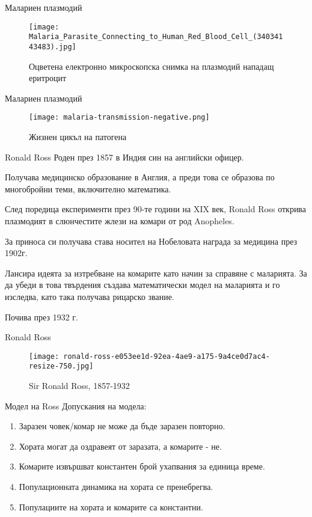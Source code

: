 \begin{frame}[t]{Малариен плазмодий}
  \begin{figure}
    \texttt{[image: Malaria\_Parasite\_Connecting\_to\_Human\_Red\_Blood\_Cell\_(34034143483).jpg]}
    \centering
    \caption{Оцветена електронно микроскопска снимка на плазмодий нападащ еритроцит}
  \end{figure}
\end{frame}

\begin{frame}[t]{Малариен плазмодий}
  \begin{figure}
    \texttt{[image: malaria-transmission-negative.png]}
    \centering
    \caption{Жизнен цикъл на патогена}
  \end{figure}
\end{frame}

\begin{frame}[t]{Ronald Ross}
  Роден през 1857 в Индия син на английски офицер.

  Получава медицинско образование в Англия, а преди това се образова по многобройни теми, включително математика.

  След поредица експерименти през 90-те години на XIX век, Ronald Ross открива плазмодият в слюнчестите жлези на комари от род Anopheles.

  За приноса си получава става носител на Нобеловата награда за медицина през 1902г.

  Лансира идеята за изтребване на комарите като начин за справяне с маларията.
  За да убеди в това твърдения създава математически модел на маларията и го изследва, като така получава рицарско звание.

  Почива през 1932 г.
\end{frame}

\begin{frame}[t]{Ronald Ross}
  \begin{figure}
    \texttt{[image: ronald-ross-e053ee1d-92ea-4ae9-a175-9a4ce0d7ac4-resize-750.jpg]}
    \centering
    \caption{Sir Ronald Ross, 1857-1932}
  \end{figure}
\end{frame}

\begin{frame}[t]{Модел на Ross}
  Допускания на модела:
  \begin{enumerate}
    \item Заразен човек/комар не може да бъде заразен повторно.
    \item Хората могат да оздравеят от заразата, а комарите - не.
    \item Комарите извършват константен брой ухапвания за единица време.
    \item Популационната динамика на хората се пренебрегва.
    \item Популациите на хората и комарите са константни.
  \end{enumerate}
\end{frame}

